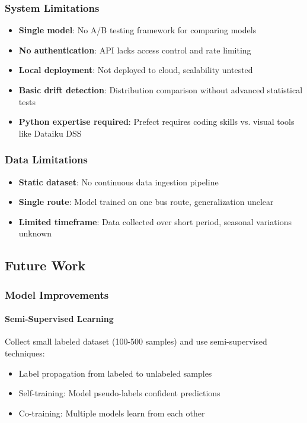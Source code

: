 \subsubsection{System Limitations}

\begin{itemize}
    \item \textbf{Single model}: No A/B testing framework for comparing models
    \item \textbf{No authentication}: API lacks access control and rate limiting
    \item \textbf{Local deployment}: Not deployed to cloud, scalability untested
    \item \textbf{Basic drift detection}: Distribution comparison without advanced statistical tests
    \item \textbf{Python expertise required}: Prefect requires coding skills vs. visual tools like Dataiku DSS
\end{itemize}

\subsubsection{Data Limitations}

\begin{itemize}
    \item \textbf{Static dataset}: No continuous data ingestion pipeline
    \item \textbf{Single route}: Model trained on one bus route, generalization unclear
    \item \textbf{Limited timeframe}: Data collected over short period, seasonal variations unknown
\end{itemize}

\subsection{Future Work}

\subsubsection{Model Improvements}

\paragraph{Semi-Supervised Learning}
Collect small labeled dataset (100-500 samples) and use semi-supervised techniques:
\begin{itemize}
    \item Label propagation from labeled to unlabeled samples
    \item Self-training: Model pseudo-labels confident predictions
    \item Co-training: Multiple models learn from each other
\end{itemize}

